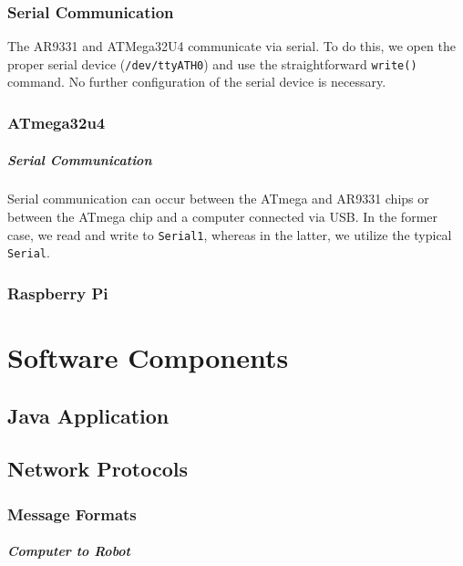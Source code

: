 \documentclass[letterpaper,12pt]{report}
\begin{document}
\subsection{Serial Communication}
\label{sec:ar9331_serial_com}
The AR9331 and ATMega32U4 communicate via serial. To do this, we open the proper
serial device (\texttt{/dev/ttyATH0}) and use the straightforward
\texttt{write()} command. No further configuration of the serial device is
necessary.

\subsection{ATmega32u4}

\paragraph{Serial Communication}
\label{sec:atmega_serial_com}

Serial communication can occur between the ATmega and AR9331 chips or between
the ATmega chip and a computer connected via USB. In the former case, we read
and write to \texttt{Serial1}, whereas in the latter, we utilize the typical
\texttt{Serial}.

\subsection{Raspberry Pi}

\chapter{Software Components}
\section{Java Application}

\section{Network Protocols}

\subsection{Message Formats}

\paragraph{Computer to Robot}
\label{sec:comp_robot_msg}
\end{document}
